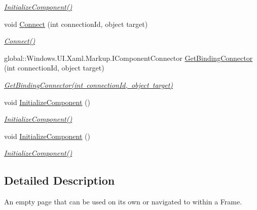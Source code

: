 \begin{DoxyCompactItemize}
\begin{DoxyCompactList}\small\item\em \mbox{\hyperlink{class_r_f_storage_1_1_main_page_a44b868cd44ff5ee9dbe953b104a1f9a1}{Initialize\+Component()}} \end{DoxyCompactList}\item 
void \mbox{\hyperlink{class_r_f_storage_1_1_main_page_a3d153ccb2e1e207f6861ab7734d25553}{Connect}} (int connection\+Id, object target)
\begin{DoxyCompactList}\small\item\em \mbox{\hyperlink{class_r_f_storage_1_1_main_page_a3d153ccb2e1e207f6861ab7734d25553}{Connect()}} \end{DoxyCompactList}\item 
global\+::\+Windows.\+U\+I.\+Xaml.\+Markup.\+I\+Component\+Connector \mbox{\hyperlink{class_r_f_storage_1_1_main_page_ad0016dfc7ea25fce116dcb6066271970}{Get\+Binding\+Connector}} (int connection\+Id, object target)
\begin{DoxyCompactList}\small\item\em \mbox{\hyperlink{class_r_f_storage_1_1_main_page_ad0016dfc7ea25fce116dcb6066271970}{Get\+Binding\+Connector(int connection\+Id, object target)}} \end{DoxyCompactList}\item 
void \mbox{\hyperlink{class_r_f_storage_1_1_main_page_a44b868cd44ff5ee9dbe953b104a1f9a1}{Initialize\+Component}} ()
\begin{DoxyCompactList}\small\item\em \mbox{\hyperlink{class_r_f_storage_1_1_main_page_a44b868cd44ff5ee9dbe953b104a1f9a1}{Initialize\+Component()}} \end{DoxyCompactList}\item 
void \mbox{\hyperlink{class_r_f_storage_1_1_main_page_a44b868cd44ff5ee9dbe953b104a1f9a1}{Initialize\+Component}} ()
\begin{DoxyCompactList}\small\item\em \mbox{\hyperlink{class_r_f_storage_1_1_main_page_a44b868cd44ff5ee9dbe953b104a1f9a1}{Initialize\+Component()}} \end{DoxyCompactList}\end{DoxyCompactItemize}


\subsection{Detailed Description}
An empty page that can be used on its own or navigated to within a Frame. 




